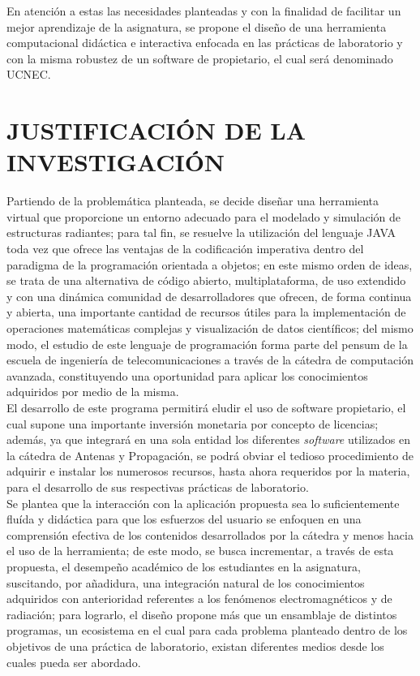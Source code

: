 En atención a estas las necesidades planteadas y con la finalidad de facilitar un mejor aprendizaje de la asignatura, se propone el diseño de una herramienta computacional didáctica e interactiva enfocada en las prácticas de laboratorio y con la misma robustez de un software de propietario, el cual será denominado UCNEC.


\newpage
\section{JUSTIFICACIÓN DE LA INVESTIGACIÓN}

Partiendo de la problemática planteada, se decide diseñar una herramienta virtual que proporcione un entorno adecuado para el modelado y simulación de estructuras radiantes; para tal fin, se resuelve la utilización del lenguaje JAVA toda vez que ofrece las ventajas de la codificación imperativa dentro del paradigma de la programación orientada a objetos; en este mismo orden de ideas, se trata de una alternativa de código abierto, multiplataforma, de uso extendido y con una dinámica comunidad de desarrolladores que ofrecen, de forma continua y abierta, una importante cantidad de recursos útiles para la implementación de operaciones matemáticas complejas y visualización de datos científicos; del mismo modo, el estudio de este lenguaje de programación forma parte del pensum de la escuela de ingeniería de telecomunicaciones a través de la cátedra de computación avanzada, constituyendo una oportunidad para aplicar los conocimientos adquiridos por medio de la misma.\\
El desarrollo de este programa permitirá eludir el uso de software propietario, el cual supone una importante inversión monetaria por concepto de licencias; además, ya que integrará en una sola entidad los diferentes \textit{software} utilizados en la cátedra de Antenas y Propagación, se podrá obviar el tedioso procedimiento de adquirir e instalar los numerosos recursos, hasta ahora requeridos por la materia, para el desarrollo de sus respectivas prácticas de laboratorio.\\
Se plantea que la interacción con la aplicación propuesta sea lo suficientemente fluída y didáctica para que los esfuerzos del usuario se enfoquen en una comprensión efectiva de los contenidos desarrollados por la cátedra y menos hacia el uso de la herramienta; de este modo, se busca incrementar, a través de esta propuesta, el desempeño académico de los estudiantes en la asignatura, suscitando, por añadidura, una integración natural de los conocimientos adquiridos con anterioridad referentes a los fenómenos electromagnéticos y de radiación; para lograrlo, el diseño propone más que un ensamblaje de distintos programas, un ecosistema en el cual para cada problema planteado dentro de los objetivos de una práctica de laboratorio, existan diferentes medios desde los cuales pueda ser abordado.\\
